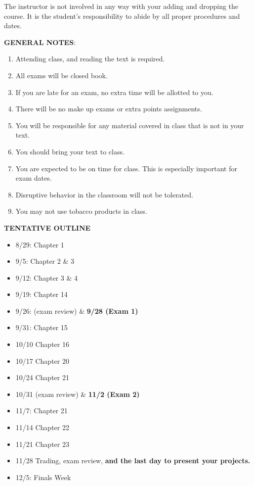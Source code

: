 \documentclass{article}
\begin{document}
The instructor is not involved in any way with your adding and dropping the course.  It is the student's responsibility to abide by all proper procedures and dates.  \\
\begin{center}
{\bf GENERAL NOTES}:
\end{center}
\begin{enumerate}
\item Attending class, and reading the text is required.
\item All exams will be closed book.
\item If you are late for an exam, no extra time will be allotted to you.
\item There will be no make up exams or extra points assignments.
\item You will be responsible for any material covered in class that is not in your text.
\item You should bring your text to class.
\item You are expected to be on time for class. This is especially important for exam
dates.
\item Disruptive behavior in the classroom will not be tolerated.
\item You may not use tobacco products in class.
\end{enumerate}
\begin{center}
\vspace*{5pt}
{\bf TENTATIVE OUTLINE}
\end{center}
\begin{itemize}
\item 8/29: Chapter 1
\item 9/5:  Chapter 2 \& 3
\item 9/12: Chapter 3 \& 4
\item 9/19: Chapter 14
\item 9/26: (exam review) \& {\bf 9/28 (Exam 1)}
\item 9/31: Chapter 15
\item 10/10 Chapter 16
\item 10/17 Chapter 20
\item 10/24 Chapter 21
\item 10/31 (exam review) \& {\bf 11/2 (Exam 2)}
\item 11/7: Chapter 21
\item 11/14 Chapter 22
\item 11/21 Chapter 23
\item 11/28 Trading, exam review, {\bf and the last day to present your projects.}
\item 12/5: Finals Week
\end{itemize}
\end{document}
